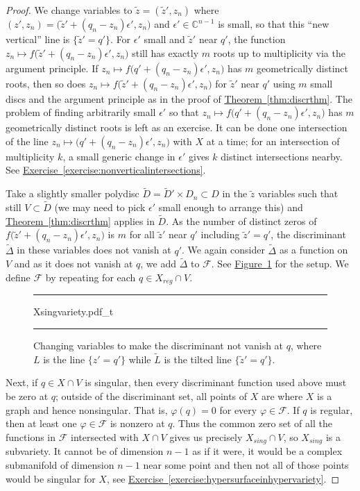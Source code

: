 \documentclass[12pt,openany]{book}
\newcommand{\C}{{\mathbb{C}}}
\newcommand{\sF}{{\mathscr{F}}}
\theoremstyle{plain}
\theoremstyle{remark}
\theoremstyle{definition}
\newenvironment{myfig}{%
\begin{figure}[h!t]
\noindent\rule{\textwidth}{0.5pt}\vspace{12pt}\par\centering}%
{\par\noindent\rule{\textwidth}{0.5pt}
\end{figure}}
\theoremstyle{exercise}
\theoremstyle{example}
\newcommand{\figureref}[1]{\hyperref[#1]{Figure~\ref*{#1}}}
\newcommand{\exerciseref}[1]{\hyperref[#1]{Exercise~\ref*{#1}}}
\newcommand{\thmref}[1]{\hyperref[#1]{Theorem~\ref*{#1}}}
\begin{document}
\begin{proof}
We change variables to
$\tilde{z} = (\tilde{z}',z_n)$ where
$(z',z_n) = \bigl(\tilde{z}' + (q_n-z_n) \epsilon', z_n\bigr)$
and $\epsilon' \in \C^{n-1}$ is small,
so that this ``new vertical'' line is $\{ \tilde{z}' = q' \}$.
For $\epsilon'$ small and $\tilde{z}'$ near $q'$, the function
$z_n \mapsto f\bigl(\tilde{z}' + (q_n-z_n) \epsilon', z_n\bigr)$
still has exactly $m$ roots up to
multiplicity via the argument principle.
If $z_n \mapsto f\bigl(q' + (q_n-z_n) \epsilon', z_n\bigr)$ has $m$ geometrically
distinct roots, then so does 
$z_n \mapsto f\bigl(\tilde{z}' + (q_n-z_n) \epsilon', z_n\bigr)$
for $\tilde{z}'$ near $q'$
using $m$ small discs and
the argument principle as in the proof of \thmref{thm:discrthm}.
The problem of finding arbitrarily small $\epsilon'$ so that
$z_n \mapsto f\bigl(q' + (q_n-z_n) \epsilon', z_n\bigr)$ has $m$ geometrically
distinct roots is left as an exercise.
It can be done one intersection of the line
$z_n \mapsto \bigl(q' + (q_n-z_n) \epsilon', z_n\bigr)$ with $X$ at a time;
for an intersection of multiplicity $k$, a small generic change in
$\epsilon'$ gives $k$ distinct intersections nearby.
See \exerciseref{exercise:nonverticalintersections}.

Take a slightly smaller polydisc
$\widetilde{D} = \widetilde{D}' \times D_n \subset D$
in the $\tilde{z}$ variables
such that
still $V \subset \widetilde{D}$ (we may need to pick $\epsilon'$ small
enough to arrange this)
and \thmref{thm:discrthm} applies in $\widetilde{D}$.
As the number
of distinct zeros of $f\bigl(\tilde{z}' + (q_n-z_n) \epsilon', z_n\bigr)$ is $m$
for all $\tilde{z}'$ near $q'$ including $\tilde{z}'=q'$,
the discriminant
$\widetilde{\Delta}$ in these variables does not vanish at $q'$.
We again consider $\widetilde{\Delta}$ as a function
on $V$ and as it does not vanish at $q$, we add $\widetilde{\Delta}$ to $\sF$.
See \figureref{fig:Xsingvariety} for the setup.
We define $\sF$ by repeating for each
$q \in X_{\mathit{reg}} \cap V$.

\begin{myfig}
\medskip
{Xsingvariety.pdf_t}
\bigskip
\caption{Changing variables to make the discriminant not vanish at
$q$, where $L$ is the line $\{z' = q'\}$ while $\widetilde{L}$
is the tilted line $\{ \tilde{z}' = q' \}$.\label{fig:Xsingvariety}}
\end{myfig}

\pagebreak[2]
Next, if $q \in X \cap V$ is singular, then every discriminant function
used above must be zero at $q$;
outside of the discriminant set, all points of $X$ are where $X$ is a graph
and hence nonsingular.
That is, $\varphi(q)=0$ for every $\varphi \in \sF$.
If $q$ is regular, then at least one $\varphi \in \sF$ is nonzero at $q$.
Thus the common zero set of all the functions in $\sF$ intersected with
$X \cap V$ gives us precisely $X_{\mathit{sing}} \cap V$, so
$X_{\mathit{sing}}$ is a subvariety.  It cannot be of dimension $n-1$ as
if it were,
it would be a complex submanifold of dimension $n-1$ near some
point and then not all of those points would be singular for $X$,
see \exerciseref{exercise:hypersurfaceinhypervariety}.
\end{proof}
\end{document}
